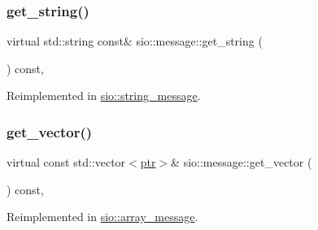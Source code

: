 \mbox{\label{classsio_1_1message_a8e923d7e688e1bc69b586ef33684dd7a}} 
\subsubsection{\texorpdfstring{get\+\_\+string()}{get\_string()}}
{\footnotesize\ttfamily virtual std\+::string const\& sio\+::message\+::get\+\_\+string (\begin{DoxyParamCaption}{ }\end{DoxyParamCaption}) const\hspace{0.3cm}{\ttfamily [inline]}, {\ttfamily [virtual]}}



Reimplemented in \hyperlink{classsio_1_1string__message_a8c79f0c15468e15251029c9f1612ca44}{sio\+::string\+\_\+message}.

\mbox{\label{classsio_1_1message_af310192e16427f655dc89c627aae4fe7}} 
\subsubsection{\texorpdfstring{get\+\_\+vector()}{get\_vector()}\hspace{0.1cm}{\footnotesize\ttfamily [1/2]}}
{\footnotesize\ttfamily virtual const std\+::vector$<$\hyperlink{classsio_1_1message_a6340b6fef57e4516eb17928b1885a615}{ptr}$>$\& sio\+::message\+::get\+\_\+vector (\begin{DoxyParamCaption}{ }\end{DoxyParamCaption}) const\hspace{0.3cm}{\ttfamily [inline]}, {\ttfamily [virtual]}}



Reimplemented in \hyperlink{classsio_1_1array__message_a298e6b4d041e95ac5b90cdff6fdef5fb}{sio\+::array\+\_\+message}.

\mbox{\label{classsio_1_1message_af62004da998c98ee7039a26d809c44d3}} 
